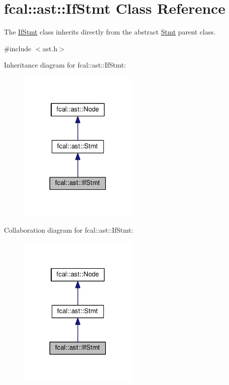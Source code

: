 \hypertarget{classfcal_1_1ast_1_1IfStmt}{}\section{fcal\+:\+:ast\+:\+:If\+Stmt Class Reference}
\label{classfcal_1_1ast_1_1IfStmt}


The \hyperlink{classfcal_1_1ast_1_1IfStmt}{If\+Stmt} class inherits directly from the abstract \hyperlink{classfcal_1_1ast_1_1Stmt}{Stmt} parent class.  




{\ttfamily \#include $<$ast.\+h$>$}



Inheritance diagram for fcal\+:\+:ast\+:\+:If\+Stmt\+:\nopagebreak
\begin{figure}[H]
\begin{center}
\leavevmode
\includegraphics[width=165pt]{classfcal_1_1ast_1_1IfStmt__inherit__graph}
\end{center}
\end{figure}


Collaboration diagram for fcal\+:\+:ast\+:\+:If\+Stmt\+:\nopagebreak
\begin{figure}[H]
\begin{center}
\leavevmode
\includegraphics[width=165pt]{classfcal_1_1ast_1_1IfStmt__coll__graph}
\end{center}
\end{figure}
